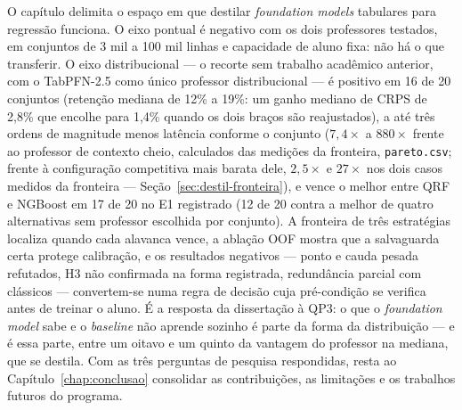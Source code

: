 O capítulo delimita o espaço em que destilar \emph{foundation
models} tabulares para regressão funciona. O eixo pontual é negativo
com os dois professores testados, em conjuntos de 3 mil a 100 mil
linhas e capacidade de aluno fixa: não há o que
transferir. O eixo distribucional --- o recorte sem trabalho
acadêmico
anterior, com o TabPFN-2.5 como único professor distribucional --- é
positivo em 16 de 20 conjuntos (retenção mediana de
12\% a 19\%: um ganho mediano de CRPS de 2,8\% que encolhe para
1,4\% quando os dois braços são reajustados), a até três
ordens de magnitude menos latência conforme o conjunto ($7{,}4\times$
a $880\times$ frente ao professor de contexto cheio, calculados das
medições da fronteira, \texttt{pareto.csv}; frente à
configuração competitiva mais barata dele, $2{,}5\times$ e $27\times$
nos dois casos medidos da fronteira ---
Seção~\ref{sec:destil-fronteira}), e
vence o melhor entre QRF e NGBoost em 17 de 20 no E1 registrado
(12 de 20 contra a melhor de quatro alternativas sem professor
escolhida por conjunto).
A fronteira de três
estratégias localiza quando cada alavanca vence, a ablação OOF mostra
que a salvaguarda certa protege calibração, e os resultados negativos
--- ponto e cauda pesada refutados, H3 não confirmada na forma
registrada, redundância parcial
com clássicos --- convertem-se numa
regra de decisão cuja pré-condição se verifica antes de treinar o
aluno. É a
resposta da dissertação à QP3: o que o \emph{foundation model} sabe e o
\emph{baseline} não aprende sozinho é parte da forma da distribuição
--- e é essa parte, entre um oitavo e um quinto da vantagem do
professor na mediana, que se
destila. Com as três perguntas de pesquisa respondidas, resta ao
Capítulo~\ref{chap:conclusao} consolidar as contribuições, as
limitações e os trabalhos futuros do programa.
